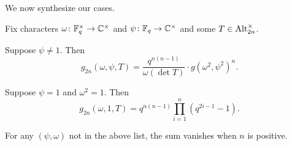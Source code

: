 We now synthesize our cases.
\begin{theorem} \label{thm:gsum-alt}
    Fix characters $\omega\colon\mathbb F_q^\times\to\mathbb C^\times$ and $\psi\colon\mathbb F_q\to\mathbb C^\times$ and some $T\in\operatorname{Alt}_{2n}^\times$.
    \begin{listalph}
        \item Suppose $\psi\ne1$. Then
        \[g_{2n}(\omega,\psi,T)=\frac{q^{n(n-1)}}{\omega(\det T)}\cdot g\left(\omega^2,\psi^2\right)^n.\]
        \item Suppose $\psi=1$ and $\omega^2=1$. Then
        \[g_{2n}(\omega,1,T)=q^{n(n-1)}\prod_{i=1}^{n}\left(q^{2i-1}-1\right).\]
    \end{listalph}
    For any $(\psi,\omega)$ not in the above list, the sum vanishes when $n$ is positive.
\end{theorem}

